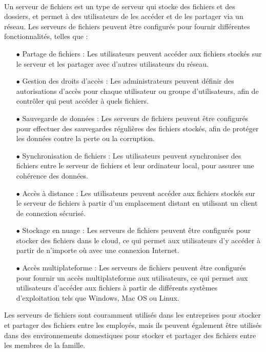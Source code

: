 \paragraph{ }
Un serveur de fichiers est un type de serveur qui stocke des fichiers et des dossiers, et permet à des utilisateurs de les accéder et de les partager via un réseau. Les serveurs de fichiers peuvent être configurés pour fournir différentes fonctionnalités, telles que :
\begin{enumerate}
 \item[$\bullet$]  Partage de fichiers : Les utilisateurs peuvent accéder aux fichiers stockés sur le serveur et les partager avec d'autres utilisateurs du réseau.
 
 \item[$\bullet$]Gestion des droits d'accès : Les administrateurs peuvent définir des autorisations d'accès pour chaque utilisateur ou groupe d'utilisateurs, afin de contrôler qui peut accéder à quels fichiers.
 
\item[$\bullet$] Sauvegarde de données : Les serveurs de fichiers peuvent être configurés pour effectuer des sauvegardes régulières des fichiers stockés, afin de protéger les données contre la perte ou la corruption.
 
\item[$\bullet$]Synchronisation de fichiers : Les utilisateurs peuvent synchroniser des fichiers entre le serveur de fichiers et leur ordinateur local, pour assurer une cohérence des données.
 
\item[$\bullet$]Accès à distance : Les utilisateurs peuvent accéder aux fichiers stockés sur le serveur de fichiers à partir d'un emplacement distant en utilisant un client de connexion sécurisé.
 
  \item[$\bullet$] Stockage en nuage : Les serveurs de fichiers peuvent être configurés pour stocker des fichiers dans le cloud, ce qui permet aux utilisateurs d'y accéder à partir de n'importe où avec une connexion Internet.
 
\item[$\bullet$] Accès multiplateforme : Les serveurs de fichiers peuvent être configurés pour fournir un accès multiplateforme aux utilisateurs, ce qui permet aux utilisateurs d'accéder aux fichiers à partir de différents systèmes d'exploitation tels que Windows, Mac OS ou Linux.
 
\end{enumerate}
Les serveurs de fichiers sont couramment utilisés dans les entreprises pour stocker et partager des fichiers entre les employés, mais ils peuvent également être utilisés dans des environnements domestiques pour stocker et partager des fichiers entre les membres de la famille.
